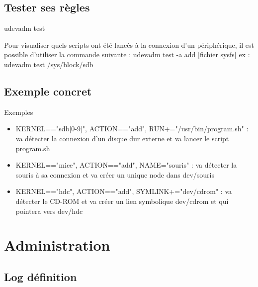 \documentclass{beamer}
\begin{document}
\subsection{Tester ses règles}
\begin{frame}
\begin{exampleblock}{udevadm test} 
		
		Pour visualiser quels scripts ont été lancés à la connexion d'un périphérique, il est possible d'utiliser la commande suivante : 
		udevadm test -a add [fichier sysfs] \newline ex : udevadm test /sys/block/sdb
\end{exampleblock}
\end{frame}

\subsection{Exemple concret}
\begin{frame}
\begin{exampleblock}{Exemples} 
	
	\begin{itemize}
		
		[circle]
		\item KERNEL=="sdb[0-9]", ACTION=="add", RUN+="/usr/bin/program.sh" : va détecter la connexion d'un disque dur externe et va lancer le script program.sh
		\item KERNEL=="mice", ACTION=="add", NAME="souris" : va détecter la souris à sa connexion et va créer un unique node dans dev/souris
		\item KERNEL=="hdc", ACTION=="add", SYMLINK+="dev/cdrom" : va détecter le CD-ROM et va créer un lien symbolique dev/cdrom et qui pointera vers dev/hdc
			
	\end{itemize}
\end{exampleblock}
\end{frame}

\section{Administration}

\subsection{Log définition}
\end{document}
